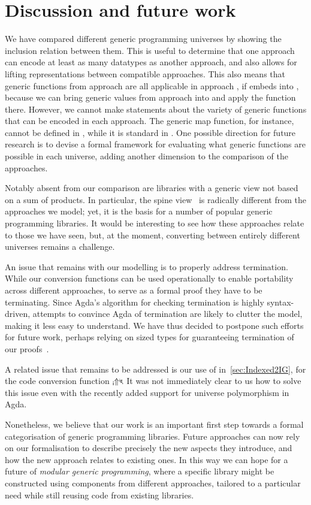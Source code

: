 \documentclass[submission,copyright,creativecommons,sharealike,noncommercial]{eptcs}
\newcommand{\Varid}[1]{\mathit{#1}}
\renewcommand\Varid[1]{\mathord{\textsf{#1}}}
\begin{document}
\section{Discussion and future work}
\label{sec:discussion}
We have compared different generic programming universes by showing the
inclusion relation between them. This is useful to determine that one approach
can encode at least as many datatypes as another approach, and also allows for
lifting representations between compatible approaches. This also means that
generic functions from approach  are all applicable in approach , if 
embeds into , because we can bring generic values from approach  into
 and apply the function there.
However, we cannot make statements
about the variety of generic functions that can be encoded in each approach. The
generic map function, for instance, cannot be defined in \ig, while it is
standard in \indexed.
One possible direction for future research is to
devise a formal framework for evaluating what generic functions are possible
in each universe, adding another dimension to the comparison of the approaches.

Notably absent from our comparison are libraries with a generic view not based
on a sum of products. In particular, the spine view~\cite{SYBreloaded} is
radically different from the approaches we model;
yet, it is the basis for a number of popular generic programming libraries.
It would be interesting to see how these approaches relate to those we have
seen, but, at the moment, converting between entirely different universes
remains a challenge.

An issue that remains with our modelling is to properly address termination.
While our conversion functions can be used operationally to enable portability
across different approaches, to serve as a formal proof they have to be
terminating. Since Agda's algorithm for checking termination is highly
syntax-driven, attempts to convince Agda of termination are likely
to clutter the model, making it less easy to understand. We have thus decided
to postpone such efforts for future work, perhaps relying on sized types for
guaranteeing termination of our proofs~\cite{MiniAgda}.

A related issue that remains to be addressed is
our use of  in~\autoref{sec:Indexed2IG}, for the code conversion
function \ensuremath{{}_{\kern0.05em \Varid{i}}\!\!\Uparrow^{_{\Varid{ig}}}\!\!}. It was not immediately clear to us how to solve this issue
even with the recently added support for universe polymorphism in Agda.

Nonetheless, we believe that our work is an important first step towards a
formal categorisation of generic programming libraries. Future approaches
can now rely on our formalisation to describe precisely the new aspects
they introduce, and how the new approach relates to existing ones. In this way
we can hope for a future of \emph{modular generic programming}, where a
specific library might be constructed using components from different
approaches, tailored to a particular need while still reusing code from
existing libraries.




\end{document}
